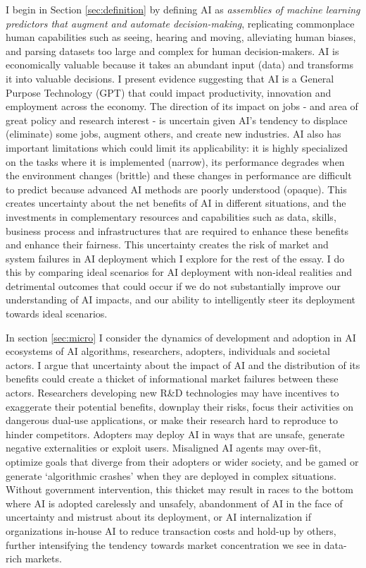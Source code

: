 \documentclass[11pt]{article}
\begin{document}
 I begin in Section \ref{sec:definition} by defining AI as \textit{assemblies of machine learning predictors that augment and automate decision-making}, replicating commonplace human capabilities such as seeing, hearing and moving, alleviating human biases, and parsing datasets too large and complex for human decision-makers. AI is economically valuable because it takes an abundant input (data) and transforms it into valuable decisions. I present evidence suggesting that AI is a General Purpose Technology (GPT) that could impact productivity, innovation and employment across the economy. The direction of its impact on jobs - and area of great policy and research interest - is uncertain given AI's tendency to displace (eliminate) some jobs, augment others, and create new industries. AI also has important limitations which could limit its applicability: it is highly specialized on the tasks where it is implemented (narrow), its performance degrades when the environment changes (brittle) and these changes in performance are difficult to predict because advanced AI methods are poorly understood (opaque). This creates uncertainty about the net benefits of AI in different situations, and the investments in complementary resources and capabilities such as data, skills, business process and infrastructures that are required to enhance these benefits and enhance their fairness. This uncertainty creates the risk of market and system failures in AI deployment which I explore for the rest of the essay. I do this by comparing ideal scenarios for AI deployment with non-ideal realities and detrimental outcomes that could occur if we do not substantially improve our understanding of AI impacts, and our ability to intelligently steer its deployment towards ideal scenarios.
 
 In section \ref{sec:micro} I consider the dynamics of development and adoption in AI ecosystems of AI algorithms, researchers, adopters, individuals and societal actors. I argue that uncertainty about the impact of AI and the distribution of its benefits could create a thicket of informational market failures between these actors. Researchers developing new R\&D technologies may have incentives to exaggerate their potential benefits, downplay their risks, focus their activities on dangerous dual-use applications, or make their research hard to reproduce to hinder competitors. Adopters may deploy AI in ways that are unsafe, generate negative externalities or exploit users. Misaligned AI agents may over-fit, optimize goals that diverge from their adopters or wider society, and be gamed or generate `algorithmic crashes' when they are deployed in complex situations. Without government intervention, this thicket may result in races to the bottom where AI is adopted carelessly and unsafely, abandonment of AI in the face of uncertainty and mistrust about its deployment, or AI internalization if organizations in-house AI to reduce transaction costs and hold-up by others, further intensifying the tendency towards market concentration we see in data-rich markets. 
 
\end{document}
